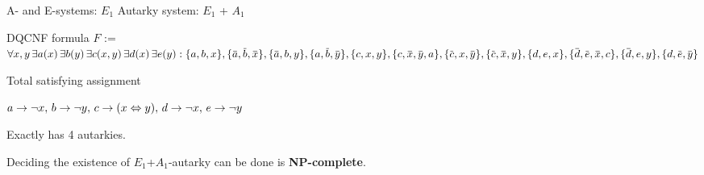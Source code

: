 \documentclass[xcolor=table	]{beamer}
\newcommand{\ov}[1]{\mkern 1.5mu\overline{\mkern-1.5mu#1\mkern-1.5mu}\mkern 1.5mu}
\begin{document}
\begin{frame}{A- and E-systems: $E_1$ Autarky system: $E_1$ + $A_1$}
\begin{alertblock}{DQCNF formula} {
		$F$ :=	$ \forall x, y \, \exists a(x) \, \exists  b(y) \, \exists c(x,y) \, \exists d(x) \, \exists e(y) :
		\{a,b,x\}, \{\ov{a},\ov{b},\ov{x}\}, \{\ov{a},b,y\}, \{a,\ov{b},\ov{y}\},  \newline 
		\{c,x,y\}, \{c,\ov{x},\ov{y}, a\}, \{\ov{c},x,\ov{y}\}, \{\ov{c},\ov{x},y\}, \newline 
		\{d,e,x\}, \{\ov{d},\ov{e},\ov{x}, c\}, \{\ov{d},e,y\}, \{d,\ov{e},\ov{y}\} $
	}
\end{alertblock}
\pause 
\begin{exampleblock}{Total satisfying assignment} {
		$ a \to \neg x, \, b \to \neg y, \, c \to (x \Leftrightarrow  y), \, d \to \neg x, \, e \to \neg y \newline $
		
		Exactly has 4 autarkies.
		
	}
\end{exampleblock} 
Deciding the existence of $E_1$+$A_1$-autarky can be done is
\textbf{NP-complete}.
\end{frame}
%
\end{document}
